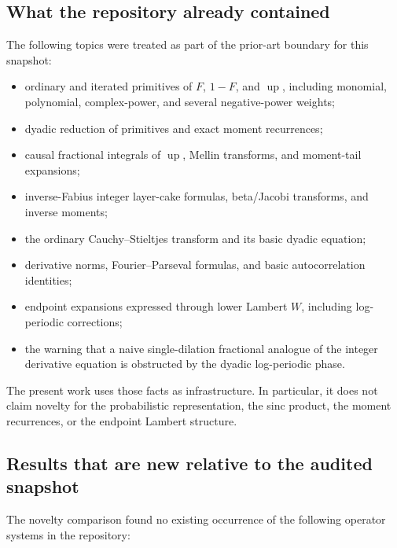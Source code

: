 \documentclass[11pt,oneside]{article}
\theoremstyle{definition}
\theoremstyle{remark}
\newcommand{\Up}{\operatorname{up}}
\begin{document}
\subsection{What the repository already contained}

The following topics were treated as part of the prior-art boundary for this
snapshot:

\begin{itemize}
\item ordinary and iterated primitives of $F$, $1-F$, and $\Up$, including
      monomial, polynomial, complex-power, and several negative-power
      weights;
\item dyadic reduction of primitives and exact moment recurrences;
\item causal fractional integrals of $\Up$, Mellin transforms, and moment-tail
      expansions;
\item inverse-Fabius integer layer-cake formulas, beta/Jacobi transforms, and
      inverse moments;
\item the ordinary Cauchy--Stieltjes transform and its basic dyadic equation;
\item derivative norms, Fourier--Parseval formulas, and basic
      autocorrelation identities;
\item endpoint expansions expressed through lower Lambert $W$, including
      log-periodic corrections;
\item the warning that a naive single-dilation fractional analogue of the
      integer derivative equation is obstructed by the dyadic log-periodic
      phase.
\end{itemize}

The present work uses those facts as infrastructure.  In particular, it does
not claim novelty for the probabilistic representation, the sinc product, the
moment recurrences, or the endpoint Lambert structure.

\subsection{Results that are new relative to the audited snapshot}

The novelty comparison found no existing occurrence of the following
operator systems in the repository:
\end{document}

